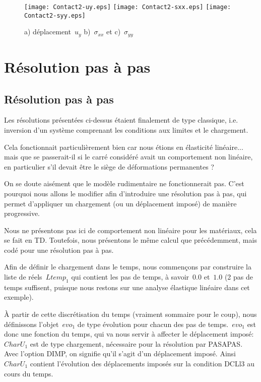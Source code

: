 \begin{figure}[ht]
  \texttt{[image: Contact2-uy.eps]} \hfill 
  \texttt{[image: Contact2-sxx.eps]}\hfill 
  \texttt{[image: Contact2-syy.eps]}
  \caption{\label{Fig-Cont22} a) déplacement~$u_y$ b)~$\sigma_{xx}$ et c)~$\sigma_{yy}$}
\end{figure}














\medskip
\ifVersionAvecExemplesSepares
  \section{Résolution pas à pas}
\else
  \subsection{Résolution pas à pas}
\fi

Les résolutions présentées ci-dessus étaient finalement de type classique, i.e. inversion
d'un système comprenant les conditions aux limites et le chargement.

Cela fonctionnait particulièrement bien car nous étions en élasticité linéaire...
mais que se passerait-il si le carré considéré avait un comportement non linéaire,
en particulier s'il devait être le siège de déformations permanentes ?

On se doute aisément que le modèle rudimentaire ne fonctionnerait pas.
C'est pourquoi nous allons le modifier afin d'introduire une résolution pas à pas, qui permet 
d'appliquer un chargement (ou un déplacement imposé) de manière progressive.

\medskip
Nous ne présentons pas ici de comportement non linéaire pour les matériaux, cela se fait
en TD. Toutefois, nous présentons le même calcul que précédemment, mais codé
pour une résolution pas à pas.

\medskip
Afin de définir le chargement dans le temps, nous commençons par construire la liste de réels~$Ltemp_1$ 
qui contient les pas de temps, à savoir~$0.0$ et~$1.0$ (2 pas de temps suffisent, puisque nous
restons sur une analyse élastique linéaire dans cet exemple).

À partir de cette discrétisation du temps (vraiment sommaire pour le coup), nous définissons l'objet~$evo_1$
de type évolution pour chacun des pas de temps.~$evo_1$ est donc une fonction du temps, qui va nous servir
à affecter le déplacement imposé:~$CharU_1$ est de type chargement, nécessaire pour la résolution par
PASAPAS. Avec l'option DIMP, on signifie qu'il s'agit d'un déplacement imposé. Ainsi~$CharU_1$ contient 
l'évolution des déplacements imposés sur la condition DCLl3 au cours du temps.

